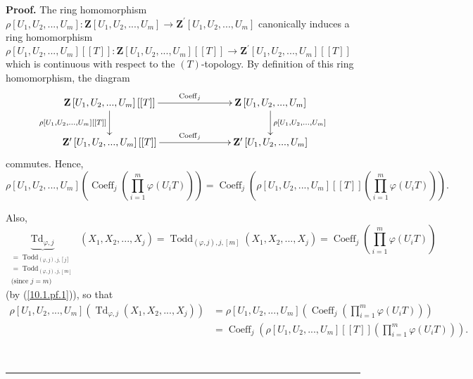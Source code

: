\documentclass[numbers=enddot,12pt,final,onecolumn,notitlepage]{scrartcl}%
\newenvironment{proof}[1][Proof]{\noindent\textbf{#1.} }{\ \rule{0.5em}{0.5em}}
\begin{document}
\begin{proof}
The ring homomorphism $\rho\left[  U_{1},U_{2},...,U_{m}\right]
:\mathbf{Z}\left[  U_{1},U_{2},...,U_{m}\right]  \rightarrow\mathbf{Z}%
^{\prime}\left[  U_{1},U_{2},...,U_{m}\right]  $ canonically induces a ring
homomorphism $\rho\left[  U_{1},U_{2},...,U_{m}\right]  \left[  \left[
T\right]  \right]  :\mathbf{Z}\left[  U_{1},U_{2},...,U_{m}\right]  \left[
\left[  T\right]  \right]  \rightarrow\mathbf{Z}^{\prime}\left[  U_{1}%
,U_{2},...,U_{m}\right]  \left[  \left[  T\right]  \right]  $ which is
continuous with respect to the $\left(  T\right)  $-topology. By definition of
this ring homomorphism, the diagram%
\[
\xymatrixcolsep{6pc}\xymatrix{
\mathbf Z\left[U_1,U_2,...,U_m\right]\left[\left[T\right]\right] \ar[r]^{\operatorname*{Coeff}_j} \ar[d]_{\rho\left[U_1,U_2,...,U_m\right]\left[\left[T\right]\right]} & \mathbf Z\left[U_1,U_2,...,U_m\right] \ar[d]^{\rho\left[U_1,U_2,...,U_m\right]} \\
\mathbf Z^{\prime}\left[U_1,U_2,...,U_m\right]\left[\left[T\right]\right] \ar[r]^{\operatorname*{Coeff}_j} & \mathbf Z^{\prime}\left[U_1,U_2,...,U_m\right]
}
\]
commutes. Hence,
\[
\rho\left[  U_{1},U_{2},...,U_{m}\right]  \left(  \operatorname*{Coeff}%
\nolimits_{j}\left(  \prod\limits_{i=1}^{m}\varphi\left(  U_{i}T\right)
\right)  \right)  =\operatorname*{Coeff}\nolimits_{j}\left(  \rho\left[
U_{1},U_{2},...,U_{m}\right]  \left[  \left[  T\right]  \right]  \left(
\prod\limits_{i=1}^{m}\varphi\left(  U_{i}T\right)  \right)  \right)  .
\]


Also,
\[
\underbrace{\operatorname*{Td}\nolimits_{\varphi,j}}%
_{\substack{=\operatorname*{Todd}\nolimits_{\left(  \varphi,j\right)
,j,\left[  j\right]  }\\=\operatorname*{Todd}\nolimits_{\left(  \varphi
,j\right)  ,j,\left[  m\right]  }\\\text{(since }j=m\text{)}}}\left(
X_{1},X_{2},...,X_{j}\right)  =\operatorname*{Todd}\nolimits_{\left(
\varphi,j\right)  ,j,\left[  m\right]  }\left(  X_{1},X_{2},...,X_{j}\right)
=\operatorname*{Coeff}\nolimits_{j}\left(  \prod\limits_{i=1}^{m}%
\varphi\left(  U_{i}T\right)  \right)
\]
(by (\ref{10.1.pf.1})), so that%
\begin{align}
\rho\left[  U_{1},U_{2},...,U_{m}\right]  \left(  \operatorname*{Td}%
\nolimits_{\varphi,j}\left(  X_{1},X_{2},...,X_{j}\right)  \right)   &
=\rho\left[  U_{1},U_{2},...,U_{m}\right]  \left(  \operatorname*{Coeff}%
\nolimits_{j}\left(  \prod\limits_{i=1}^{m}\varphi\left(  U_{i}T\right)
\right)  \right) \nonumber\\
&  =\operatorname*{Coeff}\nolimits_{j}\left(  \rho\left[  U_{1},U_{2}%
,...,U_{m}\right]  \left[  \left[  T\right]  \right]  \left(  \prod
\limits_{i=1}^{m}\varphi\left(  U_{i}T\right)  \right)  \right)  .
\label{10.21.pf.3}%
\end{align}



\end{proof}
\end{document}
